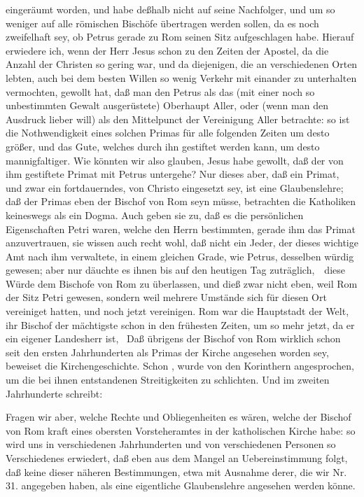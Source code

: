 \begin{aufza}
eingeräumt worden, und habe deßhalb nicht auf seine Nachfolger, und um so weniger auf alle römischen Bischöfe übertragen werden sollen, da es noch zweifelhaft sey, ob Petrus gerade zu Rom seinen Sitz aufgeschlagen habe. Hierauf erwiedere ich, wenn der Herr Jesus schon zu den Zeiten der Apostel, da die Anzahl der Christen  so gering war, und da diejenigen, die an verschiedenen Orten lebten, auch bei dem besten Willen so wenig Verkehr mit einander zu unterhalten vermochten, gewollt hat, daß man den Petrus als das (mit einer noch so unbestimmten Gewalt ausgerüstete) Oberhaupt Aller, oder (wenn man den Ausdruck lieber will) als den Mittelpunct der Vereinigung Aller betrachte: so ist die Nothwendigkeit eines solchen Primas für alle folgenden Zeiten um desto größer, und das Gute, welches durch ihn gestiftet werden kann, um desto mannigfaltiger. Wie könnten wir also glauben, Jesus habe gewollt, daß der von ihm gestiftete Primat mit Petrus untergehe? Nur dieses aber, daß ein Primat, und zwar ein fortdauerndes, von Christo eingesetzt sey, ist eine Glaubenslehre; daß der Primas eben der Bischof von Rom seyn müsse, betrachten die Katholiken keineswegs als ein Dogma. Auch geben sie zu, daß es die persönlichen Eigenschaften Petri waren, welche den Herrn bestimmten, gerade ihm das Primat anzuvertrauen, sie wissen auch recht wohl, daß nicht ein Jeder, der dieses wichtige Amt nach ihm verwaltete, in einem gleichen Grade, wie Petrus, desselben würdig gewesen; aber nur däuchte es ihnen bis auf den heutigen Tag zuträglich,~\ diese Würde dem Bischofe von Rom zu überlassen, und dieß zwar nicht eben, weil Rom der Sitz Petri gewesen, sondern weil mehrere Umstände sich für diesen Ort vereiniget hatten, und noch jetzt vereinigen. Rom war die Hauptstadt der Welt, ihr Bischof der mächtigste schon in den frühesten Zeiten, um so mehr jetzt, da er ein eigener Landesherr ist, \usw\ Daß übrigens der Bischof von Rom wirklich schon seit den ersten Jahrhunderten als Primas der Kirche angesehen worden sey, beweiset die Kirchengeschichte. Schon , wurde von den Korinthern angesprochen, um die bei ihnen entstandenen Streitigkeiten zu schlichten. Und  im zweiten Jahrhunderte schreibt:  \UmA\par
Fragen wir aber, welche Rechte und Obliegenheiten es wären, welche der Bischof von Rom kraft eines obersten Vorsteheramtes in der katholischen Kirche habe: so wird uns in verschiedenen Jahrhunderten und von verschiedenen Personen so Verschiedenes erwiedert, daß eben aus dem Mangel an Uebereinstimmung folgt, daß keine dieser näheren Bestimmungen, etwa mit Ausnahme derer, die wir Nr.\,31. angegeben haben, als eine eigentliche Glaubenslehre angesehen werden könne.
\end{aufza}

